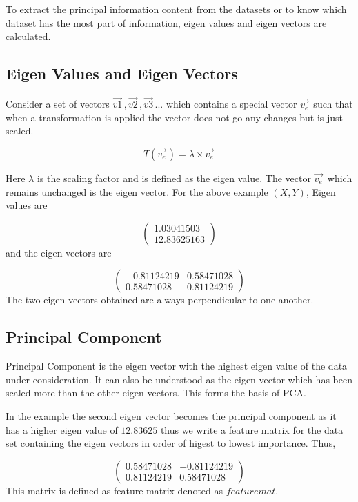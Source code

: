 \documentclass[a4paper]{article}
\begin{document}
To extract the principal information content from the datasets or to know which dataset has the most part of information, eigen values and eigen vectors are calculated.

\subsection{Eigen Values and Eigen Vectors}
Consider a set of vectors $\vec{v1}^{\,},\vec{v2}^{\,},\vec{v3}^{\,}...$ which contains a special vector $\vec{v_{e}}^{\,}$ such that when a transformation is applied the vector does not go any changes but is just scaled.

$$T(\vec{v_{e}}^{\,}) = \lambda\times\vec{v_{e}}^{\,}$$

Here $\lambda$ is the scaling factor and is defined as the eigen value. The vector $\vec{v_{e}}^{\,}$ which remains unchanged is the eigen vector.
\parskip 0pt 
For the above example $(X,Y)$, Eigen values are

$$\begin{pmatrix} 1.03041503 \\  12.83625163  \end{pmatrix}$$
\parskip 0pt 
and the eigen vectors are

$$\begin{pmatrix} -0.81124219 & 0.58471028 \\  0.58471028 & 0.81124219  \end{pmatrix}$$
\parskip 0pt 
The two eigen vectors obtained are always perpendicular to one another.

\subsection{Principal Component}
Principal Component is the eigen vector with the highest eigen value of the data under consideration. It can also be understood as the eigen vector which has been scaled more than the other eigen vectors. This forms the basis of PCA.

In the example the second eigen vector becomes the principal component as it has a higher eigen value of $12.83625$ thus we write a feature matrix for the data set containing the eigen vectors in order of higest to lowest importance. Thus,

$$\begin{pmatrix}  0.58471028 & -0.81124219\\   0.81124219 & 0.58471028 \end{pmatrix}$$
This matrix is defined as feature matrix denoted as $featuremat$.
\end{document}
